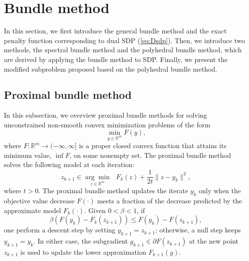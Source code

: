 \documentclass{jcmlatex}
\begin{document}
\section{Bundle method}\label{sec:2}
In this section, we first introduce the general bundle method and the exact penalty function corresponding to dual SDP (\ref{eq:Dsdp}). Then, we introduce two methods, the spectral bundle method and the polyhedral bundle method, which are derived by applying the bundle method to SDP. Finally, we present the modified subproblem proposed based on the polyhedral bundle method.
\subsection{Proximal bundle method}
In this subsection, we overview proximal bundle methods \cite{feltenmark2000dual} for solving unconstrained non-smooth convex minimization problems of the form
\begin{equation}\label{eq:F}
\underset{y\in \mathbb{R}^{m}}{\min}F(y),
\end{equation}
where \(F : \mathbb{R}^{m} \rightarrow (-\infty, \infty]\) is a proper closed convex function that attains its minimum value, \(\inf F \), on some nonempty set. The proximal bundle method solves the following model at each iteration:
\begin{equation}\label{eq:bundle}
z_{k+1}\in \underset{z\in \mathbb{R}^{m}}{\arg\min }\text{ }F_{k}(z)+\frac{1}{2t}\|z-y_{k}\|^{2},
\end{equation}
where $t>0$. The proximal bundle method updates the iterate $y_k$ only when the objective value decrease $F(\cdot)$ meets a fraction of the decrease predicted by the approximate model $F_k(\cdot)$. Given $0 < \beta < 1$, if
\begin{equation}\label{eq:decrease}
\beta(F(y_{k})-F_{k}(z_{k+1})) \leq F(y_{k})-F(z_{k+1}),
\end{equation}
one perform a descent step by setting $y_{k+1} = z_{k+1}$; otherwise, a null step keeps $y_{k+1} = y_{k}$. In either case, the subgradient $g_{k+1} \in \partial F(z_{k+1})$ at the new point $z_{k+1}$ is used to update the lower approximation $F_{k+1}(y)$.
\end{document}
